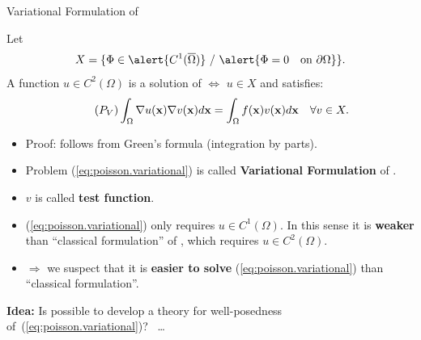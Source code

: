 \begin{frame}{Variational Formulation of \poissonProblem}
  \small
  \begin{proposition}
  Let
  $$
  X=\{ \Phi\in \alert{C^1(\overline\Omega)} \st \alert{\Phi=0 \quad \mbox{on } \partial\Omega}\}.
  $$
  A function $u\in C^2(\Omega)$ is a solution of \poissonProblem $\mathbf\Longleftrightarrow$ $u\in X$ and satisfies:
  \begin{equation}
    \tag{\ensuremath{P_V}}
    \int_\Omega \grad u(\xx) \grad v(\xx) d\xx = \int_\Omega f(\xx) v(\xx) d\xx \quad \forall v\in X.
    \label{eq:poisson.variational}
  \end{equation}
  \end{proposition}
  \begin{itemize}
  \item Proof: follows from Green's formula (integration by parts).
  \item Problem (\ref{eq:poisson.variational}) is called
    \alert{\textbf{Variational Formulation}} of \poissonProblem.
  \item $v$ is called \textbf{test function}.
  \item (\ref{eq:poisson.variational}) only requires
    $u\in C^1(\Omega)$. In this sense it is \textbf{weaker} than ``classical
    formulation'' of \poissonProblem, which requires $u\in C^2(\Omega)$.
  \item $\Rightarrow$ we suspect that it is \textbf{easier to solve}
    (\ref{eq:poisson.variational}) than ``classical formulation''.
  \end{itemize}
  \vspace{-1em}
  \begin{BlockNoTitle}
    \begin{center}
      \textbf{Idea:} Is possible to develop a theory for
      well-posedness of~(\ref{eq:poisson.variational})? \ \dots
    \end{center}
  \end{BlockNoTitle}
\end{frame}

